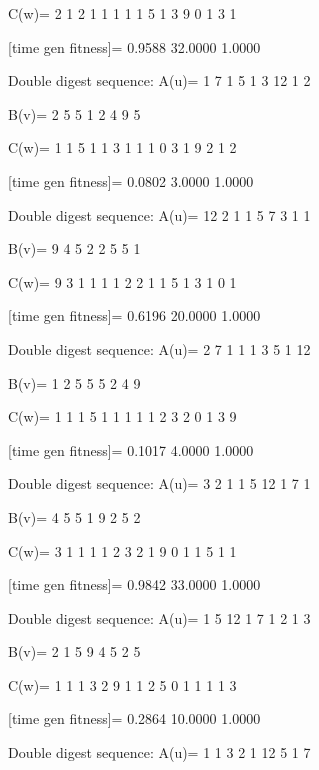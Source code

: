 C(w)=
     2     1     2     1     1     1     1     1     5     1     3     9     0     1     3     1

[time gen fitness]=
    0.9588   32.0000    1.0000

Double digest sequence:
A(u)=
     1     7     1     5     1     3    12     1     2

B(v)=
     2     5     5     1     2     4     9     5

C(w)=
     1     1     5     1     1     3     1     1     1     0     3     1     9     2     1     2

[time gen fitness]=
    0.0802    3.0000    1.0000

Double digest sequence:
A(u)=
    12     2     1     1     5     7     3     1     1

B(v)=
     9     4     5     2     2     5     5     1

C(w)=
     9     3     1     1     1     1     2     2     1     1     5     1     3     1     0     1

[time gen fitness]=
    0.6196   20.0000    1.0000

Double digest sequence:
A(u)=
     2     7     1     1     1     3     5     1    12

B(v)=
     1     2     5     5     5     2     4     9

C(w)=
     1     1     1     5     1     1     1     1     1     2     3     2     0     1     3     9

[time gen fitness]=
    0.1017    4.0000    1.0000

Double digest sequence:
A(u)=
     3     2     1     1     5    12     1     7     1

B(v)=
     4     5     5     1     9     2     5     2

C(w)=
     3     1     1     1     1     2     3     2     1     9     0     1     1     5     1     1

[time gen fitness]=
    0.9842   33.0000    1.0000

Double digest sequence:
A(u)=
     1     5    12     1     7     1     2     1     3

B(v)=
     2     1     5     9     4     5     2     5

C(w)=
     1     1     1     3     2     9     1     1     2     5     0     1     1     1     1     3

[time gen fitness]=
    0.2864   10.0000    1.0000

Double digest sequence:
A(u)=
     1     1     3     2     1    12     5     1     7

